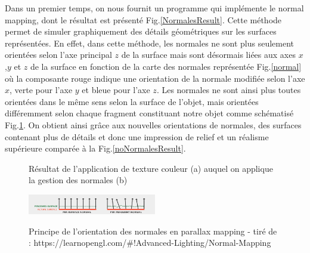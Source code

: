 \documentclass[a4paper]{article}
\begin{document}
Dans un premier temps, on nous fournit un programme qui implémente le normal mapping, dont le résultat est présenté Fig.\ref{NormalesResult}. Cette méthode permet de simuler graphiquement des détails géométriques sur les surfaces représentées. En effet, dans cette méthode, les normales ne sont plus seulement orientées selon l'axe principal $z$ de la surface mais sont désormais liées aux axes $x$,$y$ et $z$ de la surface en fonction de la carte des normales représentée Fig.\ref{normal} où la composante rouge indique une orientation de la normale modifiée selon l'axe $x$, verte pour l'axe $y$ et bleue pour l'axe $z$. Les normales ne sont ainsi plus toutes orientées dans le même sens selon la surface de l'objet, mais orientées différemment selon chaque fragment constituant notre objet comme schématisé Fig.\ref{normalOrientation}. On obtient ainsi grâce aux nouvelles orientations de normales, des surfaces contenant plus de détails et donc une impression de relief et un réalisme supérieure comparée à la Fig.\ref{noNormalesResult}.


\begin{figure}[H]
\centering
{}
\caption{Résultat de l'application de texture couleur (a) auquel on applique la gestion des normales (b)}
\end{figure}

\begin{figure}[H]
\centering
\includegraphics[width=0.5\textwidth]{figures/normalsOrientation.png}\label{normalOrientation}
\caption{Principe de l'orientation des normales en parallax mapping - tiré de :  https://learnopengl.com/\#!Advanced-Lighting/Normal-Mapping}
\end{figure}
\end{document}
